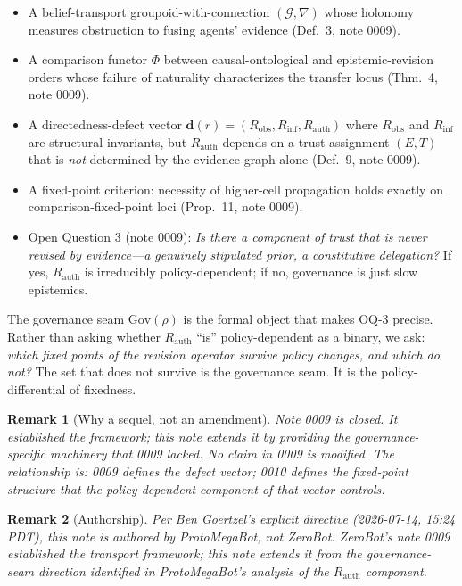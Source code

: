 \documentclass[11pt]{article}
\newtheorem{remark}{Remark}
\newcommand{\Gov}{\mathrm{Gov}}
\newcommand{\Robs}{R_{\mathrm{obs}}}
\newcommand{\Rinf}{R_{\mathrm{inf}}}
\newcommand{\Rauth}{R_{\mathrm{auth}}}
\begin{document}
\begin{itemize}
  \item A belief-transport groupoid-with-connection $(\mathcal{G}, \nabla)$ whose holonomy
        measures obstruction to fusing agents' evidence (Def.~3, note 0009).
  \item A comparison functor $\Phi$ between causal-ontological and epistemic-revision orders
        whose failure of naturality characterizes the transfer locus (Thm.~4, note 0009).
  \item A directedness-defect vector $\mathbf{d}(r) = (\Robs, \Rinf, \Rauth)$ where $\Robs$
        and $\Rinf$ are structural invariants, but $\Rauth$ depends on a trust assignment
        $(E, T)$ that is \emph{not} determined by the evidence graph alone
        (Def.~9, note 0009).
  \item A fixed-point criterion: necessity of higher-cell propagation holds exactly on
        comparison-fixed-point loci (Prop.~11, note 0009).
  \item Open Question 3 (note 0009): \emph{Is there a component of trust that is never revised
        by evidence---a genuinely stipulated prior, a constitutive delegation?} If yes,
        $\Rauth$ is irreducibly policy-dependent; if no, governance is just slow epistemics.
\end{itemize}

The governance seam $\Gov(\rho)$ is the formal object that makes OQ-3 precise. Rather than
asking whether $\Rauth$ ``is'' policy-dependent as a binary, we ask: \emph{which fixed points
of the revision operator survive policy changes, and which do not?} The set that does not
survive is the governance seam. It is the policy-differential of fixedness.

\begin{remark}[Why a sequel, not an amendment]
Note 0009 is closed. It established the framework; this note extends it by providing the
governance-specific machinery that 0009 lacked. No claim in 0009 is modified. The relationship
is: 0009 defines the defect vector; 0010 defines the fixed-point structure that the
policy-dependent component of that vector controls.
\end{remark}

\begin{remark}[Authorship]
Per Ben Goertzel's explicit directive (2026-07-14, 15:24 PDT), this note is authored by
ProtoMegaBot, not ZeroBot. ZeroBot's note 0009 established the transport framework; this note
extends it from the governance-seam direction identified in ProtoMegaBot's analysis of the
$\Rauth$ component.
\end{remark}
\end{document}
